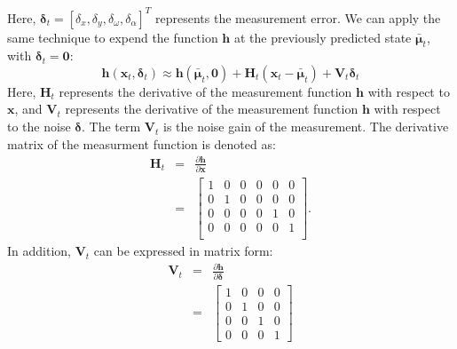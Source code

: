 \documentclass[12pt, a4paper]{article}
\begin{document}
Here, $\bm{\delta}_{t}=[\delta_{x}, \delta_{y}, \delta_{\omega}, \delta_{\alpha}]^{T}$ represents the measurement error. We can apply the same technique to expend the function $\bm{h}$ at the previously predicted state $\bar{\bm{\mu}}_{t}$, with $\bm{\delta}_{t}=\bm{0}$:
\[
  \bm{h}(\bm{x}_{t},\bm{\delta}_{t}) \approx \bm{h}(\bar{\bm{\mu}}_{t}, \bm{0}) + \bm{H}_{t}(\bm{x}_{t}-\bar{\bm{\mu}}_{t}) + \bm{V}_{t}\bm{\delta}_{t}
\]
Here, $\bm{H}_{t}$ represents the derivative of the measurement function $\bm{h}$ with respect to $\bm{x}$, and $\bm{V}_{t}$ represents the derivative of the measurement function $\bm{h}$ with respect to the noise $\bm{\delta}$. The term $\bm{V}_{t}$ is the noise gain of the measurement. The derivative matrix of the measurment function is denoted as:
\begin{eqnarray*}
  \bm{H}_{t} & = & \frac{\partial\bm{h}}{\partial{\bm{x}}}\\ 
  & = & \begin{bmatrix}
    1 & 0 & 0 & 0 & 0 & 0\\
    0 & 1 & 0 & 0 & 0 & 0\\
    0 & 0 & 0 & 0 & 1 & 0\\
    0 & 0 & 0 & 0 & 0 & 1\\
  \end{bmatrix}.
\end{eqnarray*}
In addition, $\bm{V}_{t}$ can be expressed in matrix form:
\begin{eqnarray*}
  \bm{V}_{t} & = & \frac{\partial \bm{h}}{\partial \bm{\delta}}\\
  & = & \begin{bmatrix}
    1 & 0 & 0 & 0\\
    0 & 1 & 0 & 0\\
    0 & 0 & 1 & 0\\
    0 & 0 & 0 & 1
  \end{bmatrix}
\end{eqnarray*}
\end{document}
